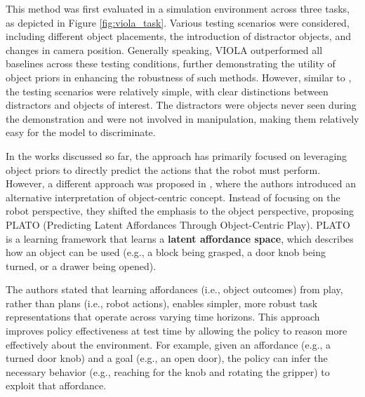 This method was first evaluated in a simulation environment across three tasks, as depicted in Figure \ref{fig:viola_task}. Various testing scenarios were considered, including different object placements, the introduction of distractor objects, and changes in camera position. Generally speaking, VIOLA outperformed all baselines across these testing conditions, further demonstrating the utility of object priors in enhancing the robustness of such methods. However, similar to \cite{devin2018deep}, the testing scenarios were relatively simple, with clear distinctions between distractors and objects of interest. The distractors were objects never seen during the demonstration and were not involved in manipulation, making them relatively easy for the model to discriminate.

In the works discussed so far, the approach has primarily focused on leveraging object priors to directly predict the actions that the robot must perform. However, a different approach was proposed in \cite{belkhale2023plato}, where the authors introduced an alternative interpretation of object-centric concept. Instead of focusing on the robot perspective, they shifted the emphasis to the object perspective, proposing PLATO (Predicting Latent Affordances Through Object-Centric Play). PLATO is a learning framework that learns a \textbf{latent affordance space}, which describes how an object can be used (e.g., a block being grasped, a door knob being turned, or a drawer being opened).

The authors stated that learning affordances (i.e., object outcomes) from play, rather than plans (i.e., robot actions), enables simpler, more robust task representations that operate across varying time horizons. This approach improves policy effectiveness at test time by allowing the policy to reason more effectively about the environment. For example, given an affordance (e.g., a turned door knob) and a goal (e.g., an open door), the policy can infer the necessary behavior (e.g., reaching for the knob and rotating the gripper) to exploit that affordance.

